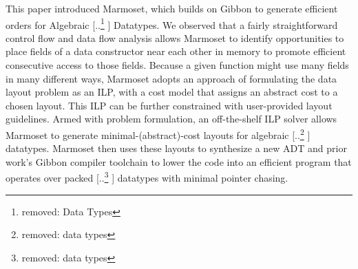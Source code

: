 \documentclass[acmsmall,review,anonymous]{acmart}\settopmatter{printfolios=true,printccs=false,printacmref=false}
\newcommand{\system}{{\sc Marmoset}\xspace}
\providecommand{\DIFaddtex}[1]{{\protect\color{blue} \sf #1}} %
\providecommand{\DIFdeltex}[1]{{\protect\color{red} [..\footnote{removed: #1} ]}} %
\providecommand{\DIFaddbegin}{} %
\providecommand{\DIFaddend}{} %
\providecommand{\DIFdelbegin}{} %
\providecommand{\DIFdelend}{} %
\providecommand{\DIFadd}[1]{\texorpdfstring{\DIFaddtex{#1}}{#1}} %
\providecommand{\DIFdel}[1]{\texorpdfstring{\DIFdeltex{#1}}{}} %
\newcommand{\DIFscaledelfig}{0.5}
\newlength{\DIFdelgraphicswidth} %
\newlength{\DIFdelgraphicsheight} %
\newcommand{\DIFaddincludegraphics}[2][]{{\color{blue}\fbox{\DIFOincludegraphics[#1]{#2}}}} %
\newcommand{\DIFdelincludegraphics}[2][]{%
\sbox{\DIFdelgraphicsbox}{\DIFOincludegraphics[#1]{#2}}%
\settoboxwidth{\DIFdelgraphicswidth}{\DIFdelgraphicsbox} %
\settoboxtotalheight{\DIFdelgraphicsheight}{\DIFdelgraphicsbox} %
\scalebox{\DIFscaledelfig}{%
\parbox[b]{\DIFdelgraphicswidth}{\usebox{\DIFdelgraphicsbox}\\[-\baselineskip] \rule{\DIFdelgraphicswidth}{0em}}\llap{\resizebox{\DIFdelgraphicswidth}{\DIFdelgraphicsheight}{%
\setlength{\unitlength}{\DIFdelgraphicswidth}%
\begin{picture}(1,1)%
\thicklines\linethickness{2pt} %
{\color[rgb]{1,0,0}\put(0,0){\framebox(1,1){}}}%
{\color[rgb]{1,0,0}\put(0,0){\line( 1,1){1}}}%
{\color[rgb]{1,0,0}\put(0,1){\line(1,-1){1}}}%
\end{picture}%
}\hspace*{3pt}}} %
} %
\DeclareRobustCommand{\DIFaddbegin}{\DIFOaddbegin \let\includegraphics\DIFaddincludegraphics} %
\DeclareRobustCommand{\DIFaddend}{\DIFOaddend \let\includegraphics\DIFOincludegraphics} %
\DeclareRobustCommand{\DIFdelbegin}{\DIFOdelbegin \let\includegraphics\DIFdelincludegraphics} %
\DeclareRobustCommand{\DIFdelend}{\DIFOaddend \let\includegraphics\DIFOincludegraphics} %
\begin{document}
This paper introduced \system, which builds on Gibbon to generate efficient orders for Algebraic \DIFdelbegin \DIFdel{Data Types}\DIFdelend \DIFaddbegin \DIFadd{Datatypes}\DIFaddend . We observed that a fairly straightforward control flow and data flow analysis allows \system to identify opportunities to place fields of a data constructor near each other in memory to promote efficient consecutive access to those fields. Because a given function might use many fields in many different ways, \system adopts an approach of formulating the data layout problem as an ILP, with a cost model that assigns an abstract cost to a chosen layout. This ILP can be further constrained with user-provided layout guidelines. Armed with problem formulation, an off-the-shelf ILP solver allows \system to generate minimal-(abstract)-cost layouts for algebraic \DIFdelbegin \DIFdel{data types}\DIFdelend \DIFaddbegin \DIFadd{datatypes}\DIFaddend . \system then uses these layouts to synthesize a new ADT and prior work's Gibbon compiler toolchain to lower the code into an efficient program that operates over packed \DIFdelbegin \DIFdel{data types }\DIFdelend \DIFaddbegin \DIFadd{datatypes }\DIFaddend with minimal pointer chasing.
\end{document}
